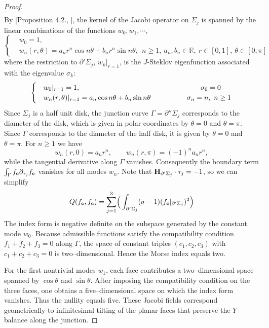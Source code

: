 \documentclass[11pt]{amsart}
\numberwithin{equation}{section}
\theoremstyle{theorem}
\theoremstyle{definition}
\numberwithin{equation}{section}
\begin{document}
\begin{proof}
\begin{equation}
\begin{split}
\end{split}
\end{equation}
By [Proposition 4.2., \cite{matinpour2024morse}], the kernel of the Jacobi operator on $\Sigma_j$ is spanned by the linear combinations of the functions $w_0, w_1,\cdots $,
  \begin{equation}
\begin{cases}
\nonumber
& w_0 = 1,  \\
& w_n(r, \theta ) = a_n r^n \cos n\theta  + b_n r^n \sin n\theta,\ \  n\geq 1,\ a_n,b_n\in \mathbb{R},\  r\in [0,1],\ \theta \in [0,\pi]
\end{cases}
\end{equation}
where the restriction to $\partial' \Sigma_j$, $w_k\vert_{r=1}$, is the $J$-Steklov eigenfunction associated with the eigenvalue $\sigma_k$:
 \begin{equation}
\begin{cases}
\nonumber
& w_0\vert_{r=1} = 1, \hspace{6cm}  \sigma_0 = 0 \\
& w_n(r, \theta )\vert_{r=1} = a_n \cos n\theta  + b_n  \sin n\theta    \hspace{1.8cm}  \sigma_n  = n,\ n\geq 1
\end{cases}
\end{equation} 
Since $\Sigma_j$ is a half unit disk, the junction curve
$\Gamma=\partial''\Sigma_j$ corresponds to the diameter of the disk,
which is given in polar coordinates by $\theta=0$ and $\theta=\pi$. Since $\Gamma$ corresponds to the diameter of the half disk,
it is given by $\theta=0$ and $\theta=\pi$.
For $n\ge1$ we have
\[
w_n(r,0)=a_n r^n,\qquad
w_n(r,\pi)=(-1)^n a_n r^n ,
\]
while the tangential derivative along $\Gamma$ vanishes.
Consequently the boundary term
$\int_{\Gamma} f_{\bold c}\partial_{\tau_j}f_{\bold c}$
vanishes for all modes $w_n$. Note that $\bold{H}_{\partial' \Sigma_j} \cdot \tau_j = -1$, so we can simplify
$$
 Q(f_{\bold{c}} , f_{\bold{c}}) 
 = \underset{j=1}{\overset{3}{\sum}} \Big (  
 \int_{\partial' \Sigma_j  }   (\sigma - 1) (f_{\bold{c}} \vert_{\partial' \Sigma_j} )^2  \Big ) 
$$
The index form is negative definite on the subspace generated by
the constant mode $w_0$.  Because admissible functions satisfy the
compatibility condition $f_1+f_2+f_3=0$ along $\Gamma$, the space of
constant triples $(c_1,c_2,c_3)$ with $c_1+c_2+c_3=0$ is
two--dimensional.  Hence the Morse index equals two.

For the first nontrivial modes $w_1$, each face contributes a
two--dimensional space spanned by $\cos\theta$ and $\sin\theta$.
After imposing the compatibility condition on the three faces,
one obtains a five--dimensional space on which the index form
vanishes.  Thus the nullity equals five. These Jacobi fields correspond geometrically to infinitesimal tilting
of the planar faces that preserve the $Y$--balance along the junction.


\end{proof}
\end{document}
